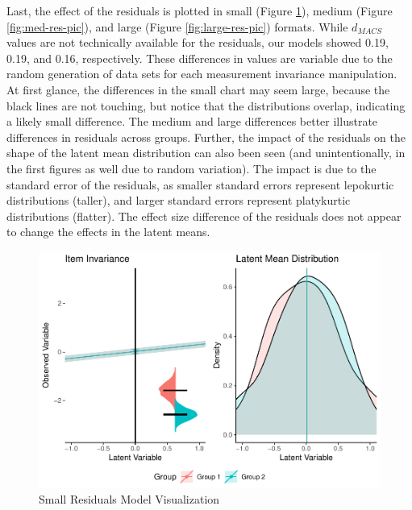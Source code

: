 \documentclass[
  man]{apa7}
\begin{document}
Last, the effect of the residuals is plotted in small (Figure \ref{fig:small-res-pic}), medium (Figure \ref{fig:med-res-pic}), and large (Figure \ref{fig:large-res-pic}) formats. While \(d_{MACS}\) values are not technically available for the residuals, our models showed 0.19, 0.19, and 0.16, respectively. These differences in values are variable due to the random generation of data sets for each measurement invariance manipulation. At first glance, the differences in the small chart may seem large, because the black lines are not touching, but notice that the distributions overlap, indicating a likely small difference. The medium and large differences better illustrate differences in residuals across groups. Further, the impact of the residuals on the shape of the latent mean distribution can also been seen (and unintentionally, in the first figures as well due to random variation). The impact is due to the standard error of the residuals, as smaller standard errors represent lepokurtic distributions (taller), and larger standard errors represent platykurtic distributions (flatter). The effect size difference of the residuals does not appear to change the effects in the latent means.

\begin{figure}
\centering
\includegraphics{manuscript_files/figure-latex/small-res-pic-1.pdf}
\caption{\label{fig:small-res-pic}Small Residuals Model Visualization}
\end{figure}
\end{document}
